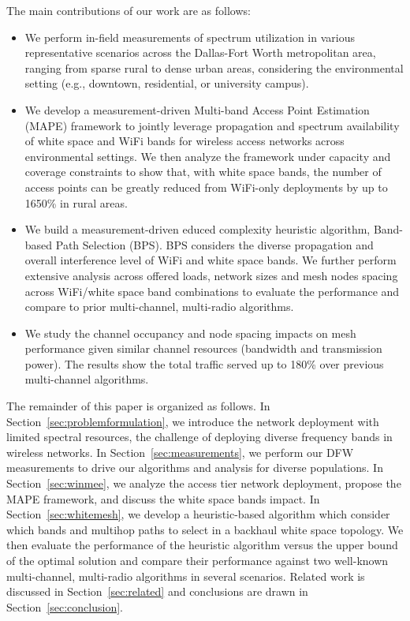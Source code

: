 The main contributions of our work are as follows:
\begin{itemize}
\item We perform in-field measurements of spectrum utilization in various representative
scenarios across the Dallas-Fort Worth metropolitan area, ranging from sparse rural to dense urban areas,  
considering the environmental setting (e.g., downtown, residential, or university campus).
\item We develop a measurement-driven Multi-band Access Point Estimation (MAPE) framework 
to jointly leverage propagation and spectrum availability of white space and WiFi bands 
for wireless access networks across environmental settings. We then analyze the framework under capacity and 
coverage constraints to show that, with white space bands, the number of access points 
can be greatly reduced from WiFi-only deployments by up to 1650\% in rural areas. 
\item We build a measurement-driven educed complexity heuristic algorithm, Band-based 
Path Selection (BPS). BPS considers the diverse propagation and overall interference level 
of WiFi and white space bands. 
We further perform extensive analysis across offered loads,
network sizes and mesh nodes spacing across WiFi/white space band combinations to evaluate the 
performance and compare to prior multi-channel, multi-radio algorithms. 
\item We study the channel occupancy and node spacing impacts on mesh performance given similar 
channel resources (bandwidth and transmission power). The results show the total traffic served 
up to 180\% over previous multi-channel algorithms.
\end{itemize}

The remainder of this paper is organized as follows. In Section~\ref{sec:problemformulation}, 
we introduce the network deployment with limited spectral resources, the challenge of deploying 
diverse frequency bands in wireless networks. 
In Section~\ref{sec:measurements}, we perform our DFW measurements to drive our algorithms and analysis
for diverse populations. 
In Section~\ref{sec:winmee}, we analyze the access tier network deployment, 
propose the MAPE framework, and discuss the white space bands impact. 
In Section~\ref{sec:whitemesh}, we develop a heuristic-based algorithm which consider which bands 
and multihop paths to select in a backhaul white space topology. We then evaluate the performance of 
the heuristic algorithm versus the upper bound of the optimal solution and 
compare their performance against two well-known multi-channel, multi-radio 
algorithms in several scenarios. Related work is discussed in Section~\ref{sec:related} and conclusions 
are drawn in Section~\ref{sec:conclusion}.

